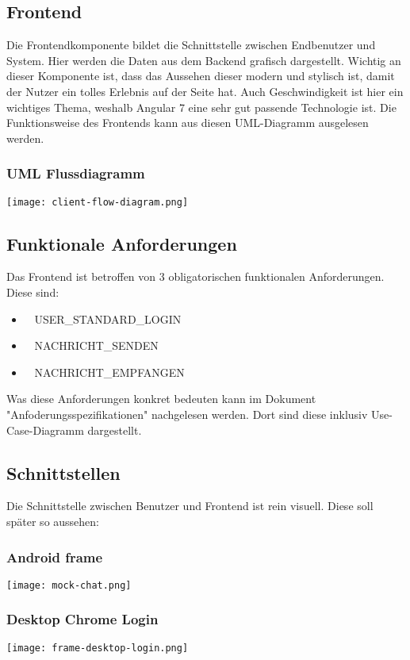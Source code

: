 	\subsection{Frontend}
	Die Frontendkomponente bildet die Schnittstelle zwischen Endbenutzer und System. Hier werden die Daten aus dem Backend grafisch dargestellt. Wichtig an dieser Komponente ist, dass das Aussehen dieser modern und stylisch ist, damit der Nutzer ein tolles Erlebnis auf der Seite hat. Auch Geschwindigkeit ist hier ein wichtiges Thema, weshalb Angular 7 eine sehr gut passende Technologie ist. Die Funktionsweise des Frontends kann aus diesen UML-Diagramm ausgelesen werden.
	\subsubsection{UML Flussdiagramm}
	\texttt{[image: client-flow-diagram.png]}

	\subsection{Funktionale Anforderungen}
	Das Frontend ist betroffen von 3 obligatorischen funktionalen Anforderungen. Diese sind:
	\begin{itemize}
		\item \faLock~ USER\_STANDARD\_LOGIN
		\item \faSend~ NACHRICHT\_SENDEN
		\item \faEnvelope~ NACHRICHT\_EMPFANGEN
	\end{itemize}
	Was diese Anforderungen konkret bedeuten kann im Dokument "Anfoderungsspezifikationen" nachgelesen werden. Dort sind diese inklusiv Use-Case-Diagramm dargestellt.

	\subsection{Schnittstellen}
	Die Schnittstelle zwischen Benutzer und Frontend ist rein visuell. Diese soll später so aussehen:

	\subsubsection{Android frame}
	\texttt{[image: mock-chat.png]}
	\subsubsection{Desktop Chrome Login}
	\texttt{[image: frame-desktop-login.png]}

